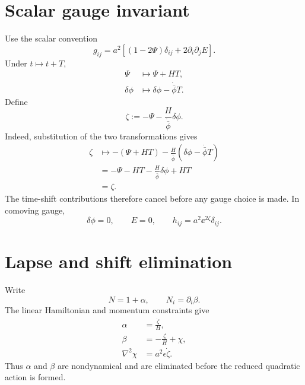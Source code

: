 \section{Scalar gauge invariant}
Use the scalar convention
\begin{equation}
g_{ij}
=a^2\left[(1-2\Psi)\delta_{ij}
+2\partial_i\partial_jE\right].
\end{equation}
Under \(t\mapsto t+T\),
\begin{align}
\Psi&\mapsto\Psi+HT,\\
\delta\phi&\mapsto\delta\phi-\dot{\bar\phi}T.
\end{align}
Define
\begin{equation}
\boxed{
\zeta
:=-\Psi-\frac{H}{\dot{\bar\phi}}\delta\phi.
}
\end{equation}
Indeed, substitution of the two transformations gives
\begin{align}
\zeta
&\mapsto
-(\Psi+HT)
-\frac{H}{\dot{\bar\phi}}
\left(\delta\phi-\dot{\bar\phi}T\right)\\
&=-\Psi-HT
-\frac{H}{\dot{\bar\phi}}\delta\phi+HT\\
&=\zeta.
\end{align}
The time-shift contributions therefore cancel before any gauge choice is made.
In comoving gauge,
\begin{equation}
\delta\phi=0,
\qquad
E=0,
\qquad
h_{ij}=a^2\ee^{2\zeta}\delta_{ij}.
\end{equation}

\section{Lapse and shift elimination}
Write
\begin{equation}
N=1+\alpha,
\qquad
N_i=\partial_i\beta.
\end{equation}
The linear Hamiltonian and momentum constraints give
\begin{align}
\alpha&=\frac{\dot\zeta}{H},\\
\beta&=-\frac{\zeta}{H}+\chi,\\
\nabla^2\chi&=a^2\epsilon\dot\zeta.
\end{align}
Thus \(\alpha\) and \(\beta\) are nondynamical and are eliminated before the reduced quadratic action is formed.

